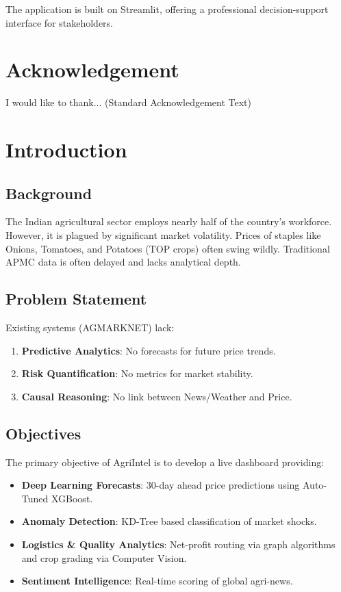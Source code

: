\documentclass[a4paper,12pt]{report}
\begin{document}
The application is built on Streamlit, offering a professional decision-support interface for stakeholders.

\chapter*{Acknowledgement}
I would like to thank... (Standard Acknowledgement Text)

\tableofcontents
\listoffigures
\listoftables

\chapter{Introduction}

\section{Background}
The Indian agricultural sector employs nearly half of the country's workforce. However, it is plagued by significant market volatility. Prices of staples like Onions, Tomatoes, and Potatoes (TOP crops) often swing wildly. Traditional APMC data is often delayed and lacks analytical depth.

\section{Problem Statement}
Existing systems (AGMARKNET) lack:
\begin{enumerate}
    \item \textbf{Predictive Analytics}: No forecasts for future price trends.
    \item \textbf{Risk Quantification}: No metrics for market stability.
    \item \textbf{Causal Reasoning}: No link between News/Weather and Price.
\end{enumerate}

\section{Objectives}
The primary objective of AgriIntel is to develop a live dashboard providing:
\begin{itemize}
    \item \textbf{Deep Learning Forecasts}: 30-day ahead price predictions using Auto-Tuned XGBoost.
    \item \textbf{Anomaly Detection}: KD-Tree based classification of market shocks.
    \item \textbf{Logistics \& Quality Analytics}: Net-profit routing via graph algorithms and crop grading via Computer Vision.
    \item \textbf{Sentiment Intelligence}: Real-time scoring of global agri-news.
\end{itemize}
\end{document}
